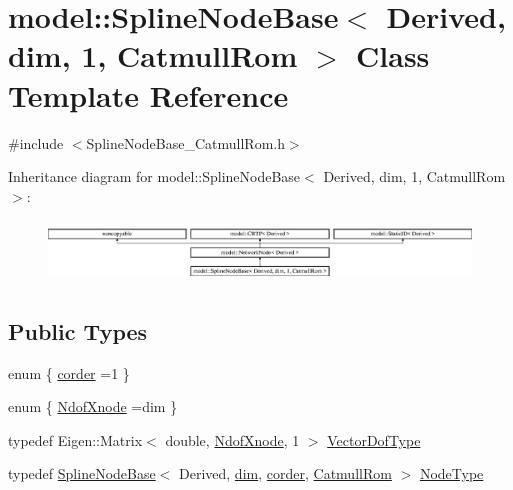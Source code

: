 \hypertarget{classmodel_1_1_spline_node_base_3_01_derived_00_01dim_00_011_00_01_catmull_rom_01_4}{}\section{model\+:\+:Spline\+Node\+Base$<$ Derived, dim, 1, Catmull\+Rom $>$ Class Template Reference}
\label{classmodel_1_1_spline_node_base_3_01_derived_00_01dim_00_011_00_01_catmull_rom_01_4}


{\ttfamily \#include $<$Spline\+Node\+Base\+\_\+\+Catmull\+Rom.\+h$>$}

Inheritance diagram for model\+:\+:Spline\+Node\+Base$<$ Derived, dim, 1, Catmull\+Rom $>$\+:\begin{figure}[H]
\begin{center}
\leavevmode
\includegraphics[height=1.651917cm]{classmodel_1_1_spline_node_base_3_01_derived_00_01dim_00_011_00_01_catmull_rom_01_4}
\end{center}
\end{figure}
\subsection*{Public Types}
\begin{DoxyCompactItemize}
\item 
enum \{ \hyperlink{classmodel_1_1_spline_node_base_3_01_derived_00_01dim_00_011_00_01_catmull_rom_01_4_ab13da9c673efb528b32f27cce59e9b90af0273aaa3354d1dcfbfb6c727a3379b3}{corder} =1
 \}
\item 
enum \{ \hyperlink{classmodel_1_1_spline_node_base_3_01_derived_00_01dim_00_011_00_01_catmull_rom_01_4_a735def12229f65db6d953b96ff2d612faaaf69fbc7315ebbd60872f115b6d3c0a}{Ndof\+Xnode} =dim
 \}
\item 
typedef Eigen\+::\+Matrix$<$ double, \hyperlink{classmodel_1_1_spline_node_base_3_01_derived_00_01dim_00_011_00_01_catmull_rom_01_4_a735def12229f65db6d953b96ff2d612faaaf69fbc7315ebbd60872f115b6d3c0a}{Ndof\+Xnode}, 1 $>$ \hyperlink{classmodel_1_1_spline_node_base_3_01_derived_00_01dim_00_011_00_01_catmull_rom_01_4_a357827d66168927f72b4b2a0bc1dc9e5}{Vector\+Dof\+Type}
\item 
typedef \hyperlink{classmodel_1_1_spline_node_base}{Spline\+Node\+Base}$<$ Derived, \hyperlink{plot_nd_a_8m_a382f3ca768b275b8d563604f7fc7df73}{dim}, \hyperlink{classmodel_1_1_spline_node_base_3_01_derived_00_01dim_00_011_00_01_catmull_rom_01_4_ab13da9c673efb528b32f27cce59e9b90af0273aaa3354d1dcfbfb6c727a3379b3}{corder}, \hyperlink{classmodel_1_1_catmull_rom}{Catmull\+Rom} $>$ \hyperlink{classmodel_1_1_spline_node_base_3_01_derived_00_01dim_00_011_00_01_catmull_rom_01_4_a62122ec7698f5b118c3d268097401fee}{Node\+Type}
\end{DoxyCompactItemize}
